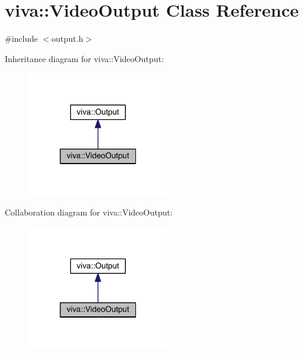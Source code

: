 \hypertarget{classviva_1_1_video_output}{}\section{viva\+:\+:Video\+Output Class Reference}
\label{classviva_1_1_video_output}


{\ttfamily \#include $<$output.\+h$>$}



Inheritance diagram for viva\+:\+:Video\+Output\+:
\nopagebreak
\begin{figure}[H]
\begin{center}
\leavevmode
\includegraphics[width=175pt]{classviva_1_1_video_output__inherit__graph}
\end{center}
\end{figure}


Collaboration diagram for viva\+:\+:Video\+Output\+:
\nopagebreak
\begin{figure}[H]
\begin{center}
\leavevmode
\includegraphics[width=175pt]{classviva_1_1_video_output__coll__graph}
\end{center}
\end{figure}
